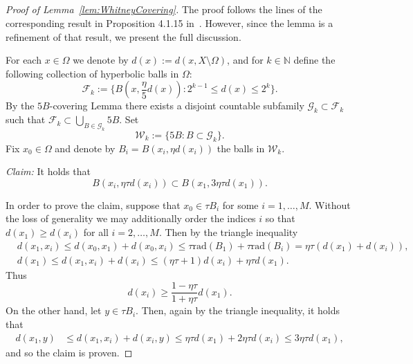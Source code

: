 \documentclass[11pt,a4paper,reqno]{amsart}
\theoremstyle{definition}
\newcommand{\Om}{\Omega}
\newcommand{\N}{\mathbb{N}}
\numberwithin{komcounter}{section}
\begin{document}
\begin{appendix}

\section{}\label{appA}

\begin{proof}[Proof of Lemma~\ref{lem:WhitneyCovering}] The proof follows the lines of the corresponding result in Proposition 4.1.15 in~\cite{hkst}. However, since the lemma is a refinement of that result, we present the full discussion.

	For each $x\in\Omega$ we denote by $d(x):=d(x,X\setminus \Omega )$, and for $k\in\N$ define the following collection of hyperbolic balls in $\Om$:
$$
 \mathcal F_k:=\{ B(x,\frac{\eta}{5}d(x)):2^{k-1}\leq d(x)\leq 2^k\}.
$$
	By the $5B$-covering Lemma there exists a disjoint countable subfamily $\mathcal G_k\subset\mathcal F_k$ such that $\mathcal F_k\subset\bigcup_{B\in \mathcal G_k}5B$. Set
$$
 \mathcal W_k:=\{ 5B:B\subset \mathcal G_k\}.
$$
Fix $x_0\in \Omega$ and denote by $B_i=B(x_i,\eta d(x_i))$ the balls in $\mathcal W_k$. 
\smallskip

\emph{Claim:} It holds that 
\begin{equation}\label{eq:Whitney2}
	B(x_i,\eta\tau d(x_i))\subset B(x_1,3\eta\tau d(x_1)).
\end{equation}

In order to prove the claim, suppose that $x_0\in \tau B_i$ for some $i=1,\dots ,M$. Without the loss of generality we may additionally order the indices $i$ so that $d(x_1)\geq d(x_i)$ for all $i=2,\dots ,M$. Then by the triangle inequality
\begin{eqnarray*}
	&d(x_1,x_i)\leq d(x_0,x_1)+d(x_0,x_i)\leq \tau\mathrm{rad}(B_1)+\tau\mathrm{rad}(B_i)=\eta\tau (d(x_1)+d(x_i)),\\
	&d(x_1)\leq d(x_1,x_i)+d(x_i)\leq (\eta\tau +1)  d(x_i)+\eta\tau d(x_1).
	\end{eqnarray*}
Thus
\begin{equation}\label{eq:Whitney1}
	d(x_i)\geq \frac{1-\eta\tau}{1+\eta\tau}d(x_1).
\end{equation}
On the other hand, let $y\in \tau B_i$. Then, again by the triangle inequality, it holds that
\begin{align*}
	d(x_1,y)&\leq d(x_1,x_i)+d(x_i,y)\leq \eta\tau d(x_1)+2\eta\tau d(x_i)\leq 3\eta\tau d(x_1),
\end{align*}
and so the claim is proven.


\end{proof}
\end{appendix}
\end{document}
